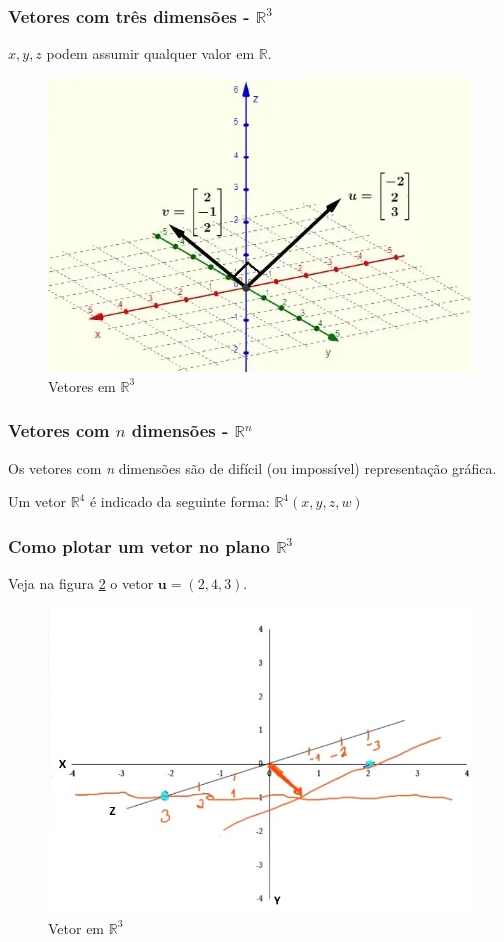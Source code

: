 \documentclass[12pt]{article}
\begin{document}
\newpage

\subsubsection{Vetores com três dimensões -  \(\mathbb{R}^3\)}

\(x, y, z\) podem assumir qualquer valor em \(\mathbb{R}\).

\begin{figure}
	\centering
	\includegraphics[width=0.5\linewidth]{"figuras/vetores R3"}
	\caption[Vetores em \( \mathbf{R}^{3} \)]{Vetores em \(\mathbb{R}^3\)}
	\label{fig:vetores-r3}
\end{figure}

\subsubsection{Vetores com \(n\) dimensões - \(\mathbb{R}^n\)}

Os vetores com \textit{n} dimensões são de difícil (ou impossível) representação gráfica.

Um vetor \(\mathbb{R}^4\) é indicado da seguinte forma: \(\mathbb{R}^4 (x, y, z, w)\)

\subsubsection{Como plotar um vetor no plano \(\mathbb{R}^3\)}

Veja na figura \ref{fig:vetor r3} o vetor \(\textbf{u} = (2,4,3)\).

\begin{figure}
	\centering
	\includegraphics[width=0.7\linewidth]{figuras/R3}
	\caption[Vetor em \( \mathbf{R}^{3} \)]{Vetor em \(\mathbb{R}^3\)}
	\label{fig:vetor r3}
\end{figure}
\end{document}
